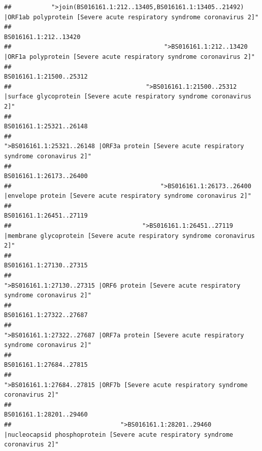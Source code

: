 \documentclass[
]{article}
\begin{document}
\begin{verbatim}
##           ">join(BS016161.1:212..13405,BS016161.1:13405..21492) |ORF1ab polyprotein [Severe acute respiratory syndrome coronavirus 2]" 
##                                                                                                                  BS016161.1:212..13420 
##                                          ">BS016161.1:212..13420 |ORF1a polyprotein [Severe acute respiratory syndrome coronavirus 2]" 
##                                                                                                                BS016161.1:21500..25312 
##                                     ">BS016161.1:21500..25312 |surface glycoprotein [Severe acute respiratory syndrome coronavirus 2]" 
##                                                                                                                BS016161.1:25321..26148 
##                                            ">BS016161.1:25321..26148 |ORF3a protein [Severe acute respiratory syndrome coronavirus 2]" 
##                                                                                                                BS016161.1:26173..26400 
##                                         ">BS016161.1:26173..26400 |envelope protein [Severe acute respiratory syndrome coronavirus 2]" 
##                                                                                                                BS016161.1:26451..27119 
##                                    ">BS016161.1:26451..27119 |membrane glycoprotein [Severe acute respiratory syndrome coronavirus 2]" 
##                                                                                                                BS016161.1:27130..27315 
##                                             ">BS016161.1:27130..27315 |ORF6 protein [Severe acute respiratory syndrome coronavirus 2]" 
##                                                                                                                BS016161.1:27322..27687 
##                                            ">BS016161.1:27322..27687 |ORF7a protein [Severe acute respiratory syndrome coronavirus 2]" 
##                                                                                                                BS016161.1:27684..27815 
##                                                    ">BS016161.1:27684..27815 |ORF7b [Severe acute respiratory syndrome coronavirus 2]" 
##                                                                                                                BS016161.1:28201..29460 
##                              ">BS016161.1:28201..29460 |nucleocapsid phosphoprotein [Severe acute respiratory syndrome coronavirus 2]" 

\end{verbatim}
\end{document}
